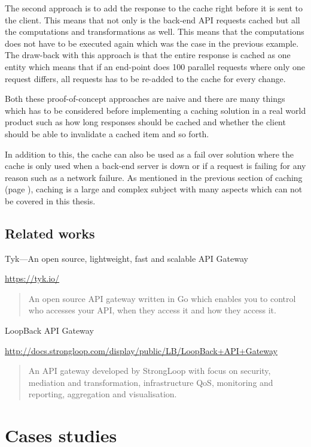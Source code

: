 \documentclass{cslthse-msc}
\begin{document}
The second approach is to add the response to the cache right before it is sent to the client. This means that not only is the back-end API requests cached but all the computations and transformations as well. This means that the computations does not have to be executed again which was the case in the previous example. The draw-back with this approach is that the entire response is cached as one entity which means that if an end-point does 100 parallel requests where only one request differs, all requests has to be re-added to the cache for every change.

Both these proof-of-concept approaches are naive and there are many things which has to be considered before implementing a caching solution in a real world product such as how long responses should be cached and whether the client should be able to invalidate a cached item and so forth. 

In addition to this, the cache can also be used as a fail over solution where the cache is only used when a back-end server is down or if a request is failing for any reason such as a network failure. As mentioned in the previous section of caching (page \pageref{caching}), caching is a large and complex subject with many aspects which can not be covered in this thesis.

\section{Related works}
Tyk---An open source, lightweight, fast and scalable API Gateway

\noindent \url{https://tyk.io/}

\begin{quote}
	An open source API gateway written in Go which enables you to control who accesses your API, when they access it and how they access it.
\end{quote}

\vspace{5mm}
\noindent LoopBack API Gateway

\noindent \url{http://docs.strongloop.com/display/public/LB/LoopBack+API+Gateway}

\begin{quote}
	An API gateway developed by StrongLoop with focus on security, mediation and transformation, infrastructure QoS, monitoring and reporting, aggregation and visualisation. 
\end{quote}


\chapter{Cases studies}
\end{document}
